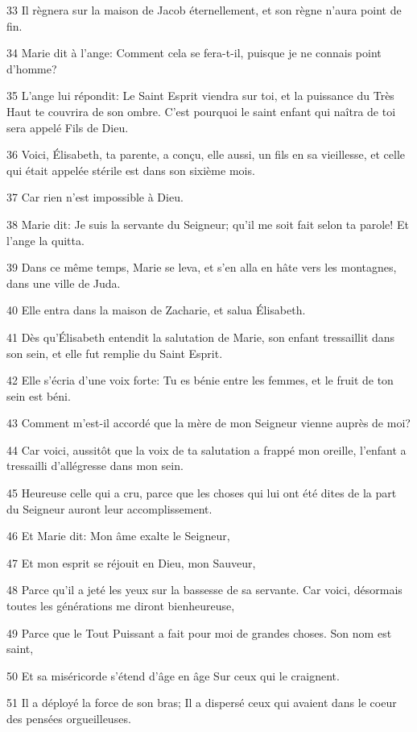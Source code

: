 \par 33 Il règnera sur la maison de Jacob éternellement, et son règne n'aura point de fin.
\par 34 Marie dit à l'ange: Comment cela se fera-t-il, puisque je ne connais point d'homme?
\par 35 L'ange lui répondit: Le Saint Esprit viendra sur toi, et la puissance du Très Haut te couvrira de son ombre. C'est pourquoi le saint enfant qui naîtra de toi sera appelé Fils de Dieu.
\par 36 Voici, Élisabeth, ta parente, a conçu, elle aussi, un fils en sa vieillesse, et celle qui était appelée stérile est dans son sixième mois.
\par 37 Car rien n'est impossible à Dieu.
\par 38 Marie dit: Je suis la servante du Seigneur; qu'il me soit fait selon ta parole! Et l'ange la quitta.
\par 39 Dans ce même temps, Marie se leva, et s'en alla en hâte vers les montagnes, dans une ville de Juda.
\par 40 Elle entra dans la maison de Zacharie, et salua Élisabeth.
\par 41 Dès qu'Élisabeth entendit la salutation de Marie, son enfant tressaillit dans son sein, et elle fut remplie du Saint Esprit.
\par 42 Elle s'écria d'une voix forte: Tu es bénie entre les femmes, et le fruit de ton sein est béni.
\par 43 Comment m'est-il accordé que la mère de mon Seigneur vienne auprès de moi?
\par 44 Car voici, aussitôt que la voix de ta salutation a frappé mon oreille, l'enfant a tressailli d'allégresse dans mon sein.
\par 45 Heureuse celle qui a cru, parce que les choses qui lui ont été dites de la part du Seigneur auront leur accomplissement.
\par 46 Et Marie dit: Mon âme exalte le Seigneur,
\par 47 Et mon esprit se réjouit en Dieu, mon Sauveur,
\par 48 Parce qu'il a jeté les yeux sur la bassesse de sa servante. Car voici, désormais toutes les générations me diront bienheureuse,
\par 49 Parce que le Tout Puissant a fait pour moi de grandes choses. Son nom est saint,
\par 50 Et sa miséricorde s'étend d'âge en âge Sur ceux qui le craignent.
\par 51 Il a déployé la force de son bras; Il a dispersé ceux qui avaient dans le coeur des pensées orgueilleuses.
